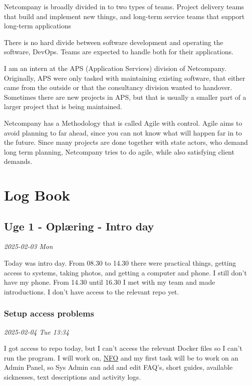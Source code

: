 \documentclass[../main.tex]{subfiles}
\begin{document}
Netcompany is broadly divided in to two types of teams. Project delivery teams that build and implement new things, and long-term service teams that support long-term applications

There is no hard divide between software development and operating the software, DevOps. Teams are expected to handle both for their applications. 

I am an intern at the APS (Application Services) division of Netcompany.
Originally, APS were only tasked with maintaining existing software, that either came from the outside or that the consultancy division wanted to handover.
Sometimes there are new projects in APS, but that is usually a smaller part of a larger project that is being maintained.  

Netcompany has a Methodology that is called Agile with control. Agile aims to avoid planning to far ahead, since you can not know what will happen far in to the future.
Since many projects are done together with state actors, who demand long term planning, Netcompany tries to do agile, while also satisfying client demands. 
\section{Log Book}
\subsection{Uge 1 - Oplæring - \textbf{Intro day}}

\textit{2025-02-03 Mon}

Today was intro day. From 08.30 to 14.30 there were practical things, getting access to systems, taking photos, and getting a computer and phone. I still don't have my phone. From 14.30 until 16.30 I met with my team and made introductions. I don't have access to the relevant repo yet.

\subsubsection{\textbf{Setup access problems}}

\textit{2025-02-04 Tue 13:34}

I got access to repo today, but I can't access the relevant Docker files so I can't run the program. I will work on, \href{https://nationaltforsoegsoverblik.dk/}{NFO} and my first task will be to work on an Admin Panel, so Sys Admin can add and edit FAQ's, short guides, available sicknesses, text descriptions and activity logs.
\end{document}
